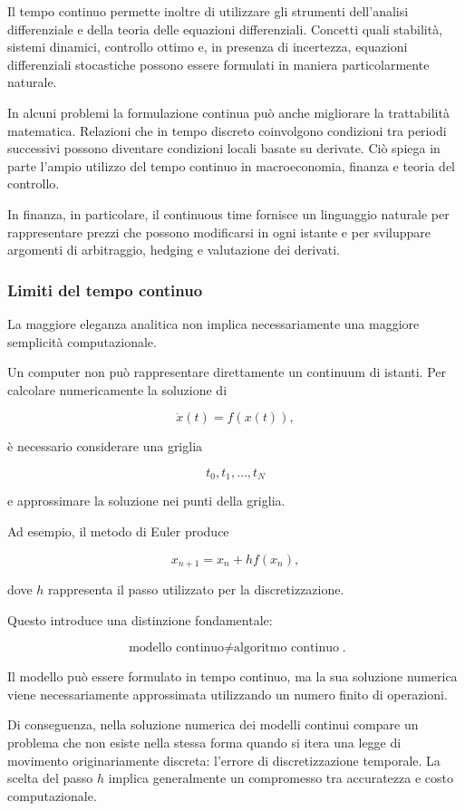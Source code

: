 \documentclass{book}
\begin{document}
Il tempo continuo permette inoltre di utilizzare gli strumenti dell'analisi differenziale e della teoria delle equazioni differenziali. Concetti quali stabilità, sistemi dinamici, controllo ottimo e, in presenza di incertezza, equazioni differenziali stocastiche possono essere formulati in maniera particolarmente naturale.

In alcuni problemi la formulazione continua può anche migliorare la trattabilità matematica. Relazioni che in tempo discreto coinvolgono condizioni tra periodi successivi possono diventare condizioni locali basate su derivate. Ciò spiega in parte l'ampio utilizzo del tempo continuo in macroeconomia, finanza e teoria del controllo.

In finanza, in particolare, il continuous time fornisce un linguaggio naturale per rappresentare prezzi che possono modificarsi in ogni istante e per sviluppare argomenti di arbitraggio, hedging e valutazione dei derivati.

\subsubsection{Limiti del tempo continuo}

La maggiore eleganza analitica non implica necessariamente una maggiore semplicità computazionale.

Un computer non può rappresentare direttamente un continuum di istanti. Per calcolare numericamente la soluzione di

$$
\dot x(t)=f(x(t)),
$$

è necessario considerare una griglia

$$
t_0,t_1,\ldots,t_N
$$

e approssimare la soluzione nei punti della griglia.

Ad esempio, il metodo di Euler produce

$$
x_{n+1}=x_n+h f(x_n),
$$

dove $h$ rappresenta il passo utilizzato per la discretizzazione.

Questo introduce una distinzione fondamentale:

$$
\boxed{
\text{modello continuo}
\neq
\text{algoritmo continuo}
}.
$$

Il modello può essere formulato in tempo continuo, ma la sua soluzione numerica viene necessariamente approssimata utilizzando un numero finito di operazioni.

Di conseguenza, nella soluzione numerica dei modelli continui compare un problema che non esiste nella stessa forma quando si itera una legge di movimento originariamente discreta: l'errore di discretizzazione temporale. La scelta del passo $h$ implica generalmente un compromesso tra accuratezza e costo computazionale.
\end{document}

